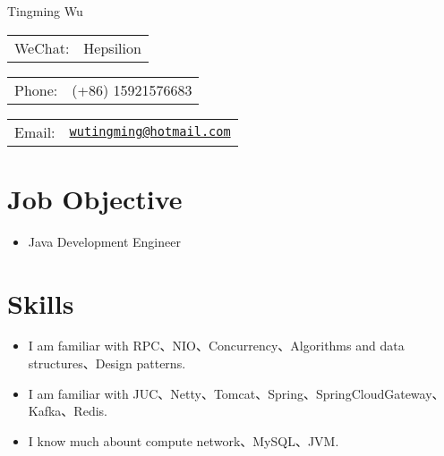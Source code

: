 \documentclass[letterpaper, UTF8]{article}
\def\name{Tingming Wu}
\begin{document}
	
	{\huge \name}
	
	
	\vspace{0.15in}  %
	
	\begin{minipage}{0.33\linewidth}
		\begin{tabular}{ll}
			WeChat: & Hepsilion \\
		\end{tabular}
	\end{minipage}
	\begin{minipage}{0.33\linewidth}
		\begin{tabular}{ll}
			Phone: & (+86) 15921576683 \\
		\end{tabular}
	\end{minipage}
	\begin{minipage}{0.33\linewidth}
		\begin{tabular}{ll}
			Email: & \href{mailto:wutingming@hotmail.com}{\tt wutingming@hotmail.com} \\
		\end{tabular}
	\end{minipage}
	\vspace{-0.1in}
	
	\section*{\textbf{Job Objective}}\vspace{-0.05in}
	\begin{itemize}
		\item Java Development Engineer
	\end{itemize}
	\vspace{-0.25in}
	
	\section*{\textbf{Skills}}\vspace{-0.05in}
	\begin{itemize}
		\item I am familiar with RPC、NIO、Concurrency、Algorithms and data structures、Design patterns.
		\item I am familiar with JUC、Netty、Tomcat、Spring、SpringCloudGateway、Kafka、Redis.
		\item I know much abount compute network、MySQL、JVM.
	\end{itemize}
	\vspace{-0.32in}
	
\end{document}
